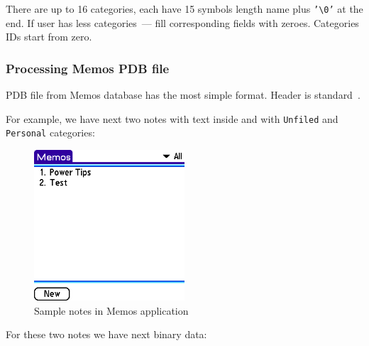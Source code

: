 \documentclass[a4paper,12pt,oneside]{scrartcl}
\begin{document}
There are up to 16 categories, each have 15 symbols length name plus
\texttt{'\textbackslash{}0'} at the end. If user has less categories~--- fill
corresponding fields with zeroes. Categories IDs start from zero.

\subsubsection{Processing Memos PDB file}
\label{sec:processing-memos-pdb}

PDB file from Memos database has the most simple format. Header is
standard~\cite{PalmFileFormatSpec}.

For example, we have next two notes with text inside and with \texttt{Unfiled}
and \texttt{Personal} categories:
\begin{figure}[H]
  \centering
  \includegraphics[width=0.5\textwidth]{memo.png}
  \caption{Sample notes in Memos application}
  \label{fig:sample-memos}
\end{figure}

For these two notes we have next binary data:
\end{document}
